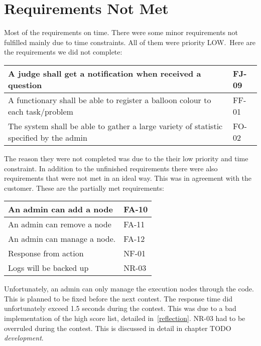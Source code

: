 \section{Requirements Not Met}\label{section:reqNotMet}
Most of the requirements on time.
There were some minor requirements not fulfilled mainly due to time
constraints. All of them were priority LOW.\ Here are the requirements
we did not complete:

\begin{center}
\begin{longtable}{|p{5cm}|l|}
\hline
A judge shall get a notification when received a question & FJ-09\\\hline
A functionary shall be able to register a balloon colour to each task/problem &
FF-01\\\hline
The system shall be able to gather a large variety of statistic specified by
the admin & FO-02\\\hline
\end{longtable}
\end{center}

The reason they were not completed was due to the their low priority and
time constraint. In addition to the unfinished requirements there were also 
requirements that were not met in an ideal way.
This was in agreement with the customer. These are the partially met
requirements:

\begin{longtable}{|l|l|}
    \hline
    An admin can add a node & FA-10 \\
    \hline
    An admin can remove a node & FA-11 \\
    \hline
    An admin can manage a node.  & FA-12 \\
    \hline
    Response from action & NF-01 \\
    \hline
    Logs will be backed up & NR-03 \\
    \hline
\end{longtable}

Unfortunately, an admin can only manage the execution nodes through the
code. This is planned to be fixed before the next contest. The response
time did unfortunately exceed 1.5 seconds during the contest. This was
due to a bad implementation of the high score list, detailed
in~\ref{reflection}. NR-03 had to be overruled during the contest. This is
discussed in detail in chapter TODO
\textit{development}.
